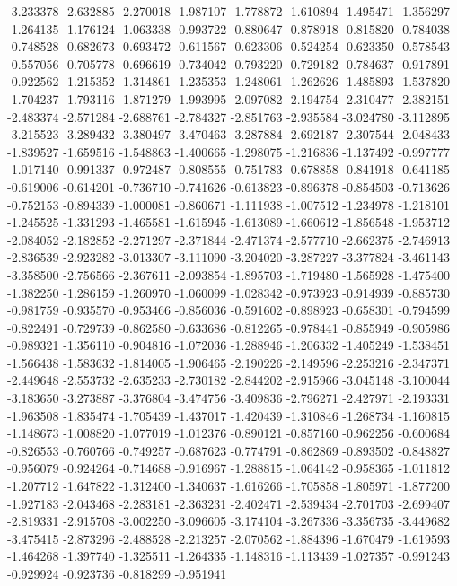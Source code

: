 -3.233378
-2.632885
-2.270018
-1.987107
-1.778872
-1.610894
-1.495471
-1.356297
-1.264135
-1.176124
-1.063338
-0.993722
-0.880647
-0.878918
-0.815820
-0.784038
-0.748528
-0.682673
-0.693472
-0.611567
-0.623306
-0.524254
-0.623350
-0.578543
-0.557056
-0.705778
-0.696619
-0.734042
-0.793220
-0.729182
-0.784637
-0.917891
-0.922562
-1.215352
-1.314861
-1.235353
-1.248061
-1.262626
-1.485893
-1.537820
-1.704237
-1.793116
-1.871279
-1.993995
-2.097082
-2.194754
-2.310477
-2.382151
-2.483374
-2.571284
-2.688761
-2.784327
-2.851763
-2.935584
-3.024780
-3.112895
-3.215523
-3.289432
-3.380497
-3.470463
-3.287884
-2.692187
-2.307544
-2.048433
-1.839527
-1.659516
-1.548863
-1.400665
-1.298075
-1.216836
-1.137492
-0.997777
-1.017140
-0.991337
-0.972487
-0.808555
-0.751783
-0.678858
-0.841918
-0.641185
-0.619006
-0.614201
-0.736710
-0.741626
-0.613823
-0.896378
-0.854503
-0.713626
-0.752153
-0.894339
-1.000081
-0.860671
-1.111938
-1.007512
-1.234978
-1.218101
-1.245525
-1.331293
-1.465581
-1.615945
-1.613089
-1.660612
-1.856548
-1.953712
-2.084052
-2.182852
-2.271297
-2.371844
-2.471374
-2.577710
-2.662375
-2.746913
-2.836539
-2.923282
-3.013307
-3.111090
-3.204020
-3.287227
-3.377824
-3.461143
-3.358500
-2.756566
-2.367611
-2.093854
-1.895703
-1.719480
-1.565928
-1.475400
-1.382250
-1.286159
-1.260970
-1.060099
-1.028342
-0.973923
-0.914939
-0.885730
-0.981759
-0.935570
-0.953466
-0.856036
-0.591602
-0.898923
-0.658301
-0.794599
-0.822491
-0.729739
-0.862580
-0.633686
-0.812265
-0.978441
-0.855949
-0.905986
-0.989321
-1.356110
-0.904816
-1.072036
-1.288946
-1.206332
-1.405249
-1.538451
-1.566438
-1.583632
-1.814005
-1.906465
-2.190226
-2.149596
-2.253216
-2.347371
-2.449648
-2.553732
-2.635233
-2.730182
-2.844202
-2.915966
-3.045148
-3.100044
-3.183650
-3.273887
-3.376804
-3.474756
-3.409836
-2.796271
-2.427971
-2.193331
-1.963508
-1.835474
-1.705439
-1.437017
-1.420439
-1.310846
-1.268734
-1.160815
-1.148673
-1.008820
-1.077019
-1.012376
-0.890121
-0.857160
-0.962256
-0.600684
-0.826553
-0.760766
-0.749257
-0.687623
-0.774791
-0.862869
-0.893502
-0.848827
-0.956079
-0.924264
-0.714688
-0.916967
-1.288815
-1.064142
-0.958365
-1.011812
-1.207712
-1.647822
-1.312400
-1.340637
-1.616266
-1.705858
-1.805971
-1.877200
-1.927183
-2.043468
-2.283181
-2.363231
-2.402471
-2.539434
-2.701703
-2.699407
-2.819331
-2.915708
-3.002250
-3.096605
-3.174104
-3.267336
-3.356735
-3.449682
-3.475415
-2.873296
-2.488528
-2.213257
-2.070562
-1.884396
-1.670479
-1.619593
-1.464268
-1.397740
-1.325511
-1.264335
-1.148316
-1.113439
-1.027357
-0.991243
-0.929924
-0.923736
-0.818299
-0.951941
